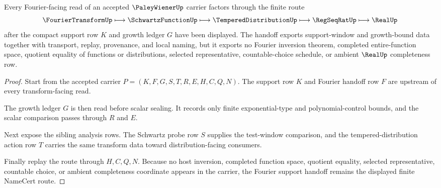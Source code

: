 \begin{theorem}
\label{thm:paley-wiener-fourier-support-handoff}
Every Fourier-facing read of an accepted $\PaleyWienerUp$ carrier factors through the finite route
$$
\FourierTransformUp \longmapsto \SchwartzFunctionUp \longmapsto \TemperedDistributionUp
\longmapsto \RegSeqRatUp \longmapsto \RealUp
$$
after the compact support row $K$ and growth ledger $G$ have been displayed. The handoff exports support-window and growth-bound data together with transport, replay, provenance, and local naming, but it exports no Fourier inversion theorem, completed entire-function space, quotient equality of functions or distributions, selected representative, countable-choice schedule, or ambient $\RealUp$ completeness row.
\end{theorem}
\begin{proof}
Start from the accepted carrier $P=(K,F,G,S,T,R,E,H,C,Q,N)$. The support row $K$ and Fourier handoff row $F$ are upstream of every transform-facing read.

The growth ledger $G$ is then read before scalar sealing. It records only finite exponential-type and polynomial-control bounds, and the scalar comparison passes through $R$ and $E$.

Next expose the sibling analysis rows. The Schwartz probe row $S$ supplies the test-window comparison, and the tempered-distribution action row $T$ carries the same transform data toward distribution-facing consumers.

Finally replay the route through $H,C,Q,N$. Because no host inversion, completed function space, quotient equality, selected representative, countable choice, or ambient completeness coordinate appears in the carrier, the Fourier support handoff remains the displayed finite NameCert route.
\end{proof}




